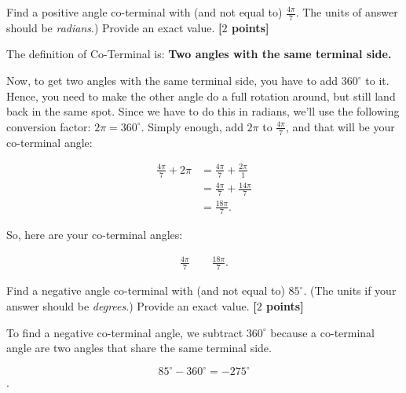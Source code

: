 \begin{problem}
  Find a positive angle co-terminal with (and not equal to) $\frac{4\pi}{7}$.
  The units of answer should be \textit{radians}.) Provide an exact value.
  \textbf{[$2$ points]}
\end{problem}

\begin{solution}
  The definition of Co-Terminal is:
  \textbf{Two angles with the same terminal side.}

  Now, to get two angles with the same terminal side, you have to add
  $360^{\circ}$ to it. Hence, you need to make the other angle do a full
  rotation around, but still land back in the same spot. Since we have to do
  this in radians, we'll use the following conversion factor: $2\pi =
  360^{\circ}$. Simply enough, add $2\pi$ to $\frac{4\pi}{7}$, and that will be
  your co-terminal angle:

  \begin{align*}
    \frac{4\pi}{7} + 2\pi &= \frac{4\pi}{7} + \frac{2\pi}{1} \\
      &= \frac{4\pi}{7} + \frac{14\pi}{7} \\
      &= \boxed{\frac{18\pi}{7}}
  .\end{align*}

  So, here are your co-terminal angles:

  \begin{align*}
    \frac{4\pi}{7} \qquad \frac{18\pi}{7}
  .\end{align*}
\end{solution}

\newpage

\begin{problem}
  Find a negative angle co-terminal with (and not equal to) $85^{\circ}$. (The
  units if your answer should be \textit{degrees}.) Provide an exact value.
  \textbf{[$2$ points]}
\end{problem}

\begin{solution}
  To find a negative co-terminal angle, we subtract $360^{\circ}$ because a
  co-terminal angle are two angles that share the same terminal side.

  \[ 85^{\circ} - 360^{\circ} = \boxed{- 275^{\circ}} \].
\end{solution}

\newpage

